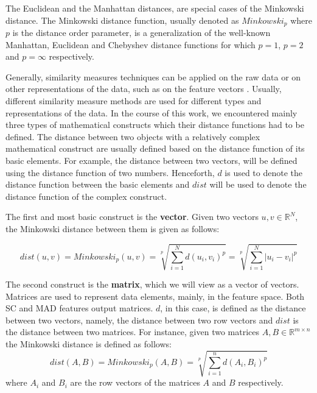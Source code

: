 \iftoggle{edit-mode}{\hspace{0pt}\marginpar{The Minkowski distance}}{}
The Euclidean and the Manhattan distances, are special cases of the Minkowski distance. The Minkowski distance function, usually denoted as $Minkowski_p$ where $p$ is the distance order parameter, is a generalization of the well-known Manhattan, Euclidean and Chebyshev distance functions for which $p=1$, $p=2$ and $p=\infty$ respectively.

\iftoggle{edit-mode}{\hspace{0pt}\marginpar{Different Representations}}{}
Generally, similarity measures techniques can be applied on the raw data or on other representations of the data, such as on the feature vectors \cite{chen2005similarity}. Usually, different similarity measure methods are used for different types and representations of the data. In the course of this work, we encountered mainly three types of mathematical constructs which their distance functions had to be defined.
The distance between two objects with a relatively complex mathematical construct are usually defined based on the distance function of its basic elements. For example, the distance between two vectors, will be defined using the distance function of two numbers. Henceforth, $d$ is used to denote the distance function between the basic elements and $dist$ will be used to denote the distance function of the complex construct.

\iftoggle{edit-mode}{\hspace{0pt}\marginpar{Vectors}}{}
The first and most basic construct is the \textbf{vector}. Given two vectors $u,v \in \mathbb{R}^{N}$, the Minkowski distance between them is given as follows:

\begin{equation}
dist(u,v)=Minkowski_p(u,v)=\sqrt[p]{\sum\limits_{i=1}^N d(u_i,v_i)^p}=\sqrt[p]{\sum\limits_{i=1}^N |u_i-v_i|^p}
\label{eq:minkowski}
\end{equation}

\iftoggle{edit-mode}{\hspace{0pt}\marginpar{Matrices}}{}
The second construct is the \textbf{matrix}, which we will view as a vector of vectors. Matrices are used to represent data elements, mainly, in the feature space. Both SC and MAD features output matrices. $d$, in this case, is defined as the distance between two vectors, namely, the distance between two row vectors and $dist$ is the distance between two matrices. For instance, given two matrices $A,B \in \mathbb{R}^{m \times n}$ the Minkowski distance is defined as follows:
\begin{equation}
dist(A,B) = Minkowski_p(A,B)=\sqrt[p]{\sum\limits_{i=1}^n d(A_i,B_i)^p}
\end{equation}
where $A_i$ and $B_i$ are the row vectors of the matrices $A$ and $B$ respectively.

